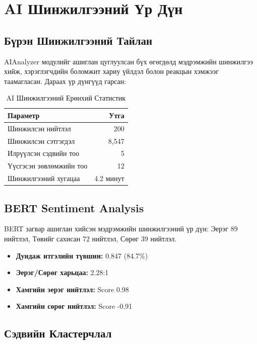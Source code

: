 \documentclass[12pt,a4paper]{report}
\begin{document}
\section{AI Шинжилгээний Үр Дүн}

\subsection{Бүрэн Шинжилгээний Тайлан}

AIAnalyzer модулийг ашиглан цуглуулсан бүх өгөгдөлд мэдрэмжийн шинжилгээ хийж, хэрэглэгчдийн боломжит хариу үйлдэл болон реакцын хэмжээг таамагласан. Дараах үр дүнгүүд гарсан:

\begin{table}[H]
\centering
\caption{AI Шинжилгээний Ерөнхий Статистик}
\begin{tabular}{|l|r|}
\hline
\textbf{Параметр} & \textbf{Утга} \\
\hline
Шинжилсэн нийтлэл & 200 \\
Шинжилсэн сэтгэгдэл & 8,547 \\
Илрүүлсэн сэдвийн тоо & 5 \\
Үүсгэсэн зөвлөмжийн тоо & 12 \\
Шинжилгээний хугацаа & 4.2 минут \\
\hline
\end{tabular}
\end{table}

\subsection{BERT Sentiment Analysis}

BERT загвар ашиглан хийсэн мэдрэмжийн шинжилгээний үр дүн: Эерэг 89 нийтлэл, Төвийг сахисан 72 нийтлэл, Сөрөг 39 нийтлэл.

\begin{itemize}
    \item \textbf{Дундаж итгэлийн түвшин:} 0.847 (84.7\%)
    \item \textbf{Эерэг/Сөрөг харьцаа:} 2.28:1
    \item \textbf{Хамгийн эерэг нийтлэл:} Score 0.98
    \item \textbf{Хамгийн сөрөг нийтлэл:} Score -0.91
\end{itemize}

\subsection{Сэдвийн Кластерчлал}
\end{document}
